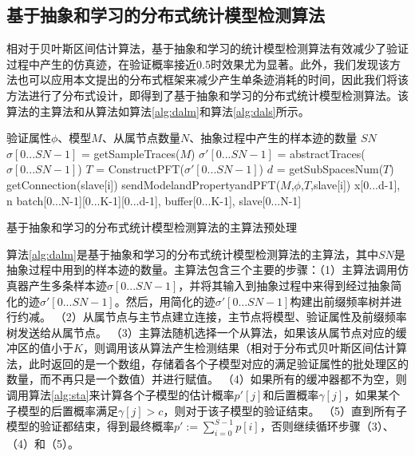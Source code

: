 \subsection{基于抽象和学习的分布式统计模型检测算法}
相对于贝叶斯区间估计算法，基于抽象和学习的统计模型检测算法有效减少了验证过程中产生的仿真迹，在验证概率接近0.5时效果尤为显著。此外，我们发现该方法也可以应用本文提出的分布式框架来减少产生单条迹消耗的时间，因此我们将该方法进行了分布式设计，即得到了基于抽象和学习的分布式统计模型检测算法。该算法的主算法和从算法如算法\ref{alg:dalm}和算法\ref{alg:dals}所示。
\begin{algorithm}[t]
\begin{algorithmic}[1]
\REQUIRE 验证属性$\phi$、模型$M$、从属节点数量$N$、抽象过程中产生的样本迹的数量 $SN$
\STATE $\sigma[0...SN-1]$ = getSampleTraces($M$)
\STATE $\sigma'[0...SN-1]$ = abstractTraces($\sigma[0...SN-1]$)
\STATE $T$ = ConstructPFT($\sigma'[0...SN-1]$)
\STATE $d$ = getSubSpacesNum($T$)
\LOOP
\STATE getConnection(slave[i])
\STATE sendModelandPropertyandPFT($M$,$\phi$,$T$,slave[i])
\RETURN
\ENDIF
\ENDLOOP
\STATE x[0...d-1], n
\STATE batch[0...N-1][0...K-1][0...d-1], buffer[0...K-1], slave[0...N-1]
\end{algorithmic}
\caption{基于抽象和学习的分布式统计模型检测算法的主算法预处理}
\label{alg:dalmy}
\end{algorithm}
算法\ref{alg:dalm}是基于抽象和学习的分布式统计模型检测算法的主算法，其中$SN$是抽象过程中用到的样本迹的数量。主算法包含三个主要的步骤：（1）主算法调用仿真器产生多条样本迹$\sigma[0...SN-1]$，并将其输入到抽象过程中来得到经过抽象简化的迹$\sigma'[0...SN-1]$。然后，用简化的迹$\sigma'[0...SN-1]$构建出前缀频率树并进行约减。 （2）从属节点与主节点建立连接，主节点将模型、验证属性及前缀频率树发送给从属节点。 （3）主算法随机选择一个从算法，如果该从属节点对应的缓冲区的值小于$K$，则调用该从算法产生检测结果（相对于分布式贝叶斯区间估计算法，此时返回的是一个数组，存储着各个子模型对应的满足验证属性的批处理区的数量，而不再只是一个数值）并进行赋值。 （4）如果所有的缓冲器都不为空，则调用算法\ref{alg:sta}来计算各个子模型的估计概率$p'[j]$和后置概率$\gamma[j]$，如果某个子模型的后置概率满足$\gamma[j] > c$，则对于该子模型的验证结束。 （5）直到所有子模型的验证都结束，得到最终概率$p' := \sum\limits_{i=0}^{S-1} p[i]$，否则继续循环步骤（3）、（4）和（5）。
